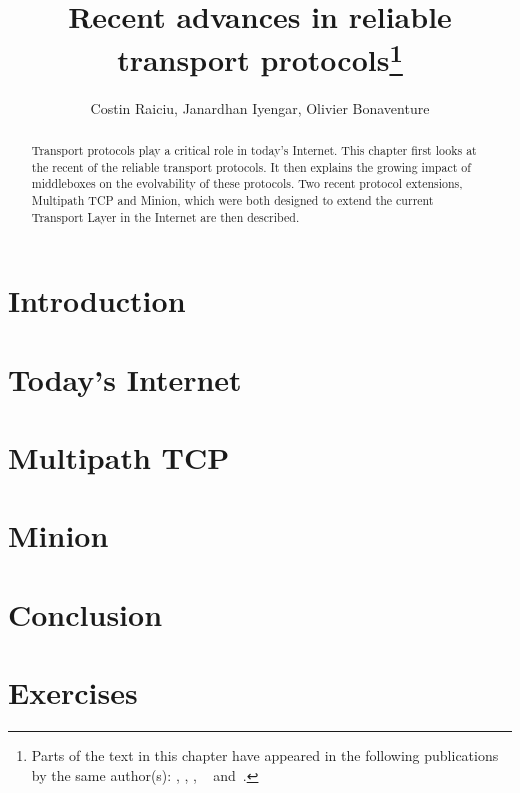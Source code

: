 \documentclass{article}
\title{Recent advances in reliable transport protocols\footnote{
Parts of the text in this chapter have appeared in the following
 publications by the same author(s): \cite{login}, \cite{mptcp-cc},
 \cite{raiciu2012hard}, ~\cite{nowlan12fitting} 
and~\cite{iyengar10minion}.}
}
\author{Costin Raiciu, Janardhan Iyengar, Olivier Bonaventure}
\date{}
\begin{document}
\maketitle

\begin{abstract}
Transport protocols play a critical role in today's Internet. This
chapter first looks at the recent of the reliable transport
protocols. It then explains the growing impact of middleboxes on the
evolvability of these protocols. 
Two recent protocol extensions,
Multipath TCP and Minion,
which were both designed to extend the current Transport Layer 
in the Internet
are then described.
\end{abstract}


\section{Introduction}




\section{Today's Internet}\label{section:today}





%

\section{Multipath TCP}\label{section:mptcp}




\section{Minion}\label{section:minion}





%

\section{Conclusion}\label{section:conclusion}




%




\appendix

\section{Exercises}


\end{document}
